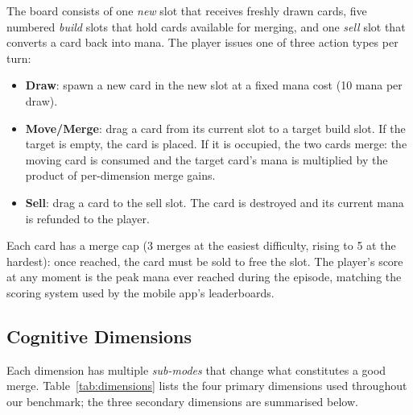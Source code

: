 \documentclass[11pt]{article}
\begin{document}
The board consists of one \emph{new} slot that receives freshly drawn cards,
five numbered \emph{build} slots that hold cards available for merging, and
one \emph{sell} slot that converts a card back into mana. The player issues
one of three action types per turn:

\begin{itemize}
  \item \textbf{Draw}: spawn a new card in the new slot at a fixed mana cost
    (10 mana per draw).
  \item \textbf{Move/Merge}: drag a card from its current slot to a target
    build slot. If the target is empty, the card is placed. If it is
    occupied, the two cards merge: the moving card is consumed and the
    target card's mana is multiplied by the product of per-dimension
    merge gains.
  \item \textbf{Sell}: drag a card to the sell slot. The card is destroyed
    and its current mana is refunded to the player.
\end{itemize}

Each card has a merge cap (3 merges at the easiest difficulty, rising to 5
at the hardest): once reached, the card must be sold to free the slot. The
player's score at any moment is the peak mana ever reached during the
episode, matching the scoring system used by the mobile app's leaderboards.

\subsection{Cognitive Dimensions}
\label{sec:dimensions}

Each dimension has multiple \emph{sub-modes} that change what constitutes a
good merge. Table~\ref{tab:dimensions} lists the four primary dimensions
used throughout our benchmark; the three secondary dimensions are
summarised below.
\end{document}
